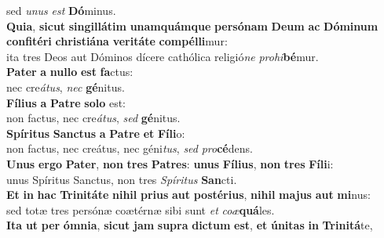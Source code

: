 \evenverse sed \textit{u}\textit{nus} \textit{est} \textbf{Dó}minus.\\
\oddverse \textbf{Qui}\textbf{a}, \textbf{si}\textbf{cut} \textbf{sin}\textbf{gil}\textbf{lá}\textbf{tim} \textbf{u}\textbf{nam}\textbf{quám}\textbf{que} \textbf{per}\textbf{só}\textbf{nam} \textbf{De}\textbf{um} \textbf{ac} \textbf{Dó}\textbf{mi}\textbf{num} \textbf{con}\textbf{fi}\textbf{té}\textbf{ri} \textbf{chri}\textbf{sti}\textbf{á}\textbf{na} \textbf{ve}\textbf{ri}\textbf{tá}\textbf{te} \textbf{com}\textbf{pél}\textbf{li}mur:~\*\\
\oddverse ita tres Deos aut Dóminos dícere cathólica religió\textit{ne} \textit{pro}\textit{hi}\textbf{bé}mur.\\
\evenverse \textbf{Pa}\textbf{ter} \textbf{a} \textbf{nul}\textbf{lo} \textbf{est} \textbf{fa}ctus:~\*\\
\evenverse nec cre\textit{á}\textit{tus}, \textit{nec} \textbf{gé}nitus.\\
\oddverse \textbf{Fí}\textbf{li}\textbf{us} \textbf{a} \textbf{Pa}\textbf{tre} \textbf{so}\textbf{lo} est:~\*\\
\oddverse non factus, nec cre\textit{á}\textit{tus}, \textit{sed} \textbf{gé}nitus.\\
\evenverse \textbf{Spí}\textbf{ri}\textbf{tus} \textbf{San}\textbf{ctus} \textbf{a} \textbf{Pa}\textbf{tre} \textbf{et} \textbf{Fí}\textbf{li}o:~\*\\
\evenverse non factus, nec creátus, nec géni\textit{tus}, \textit{sed} \textit{pro}\textbf{cé}dens.\\
\oddverse \textbf{U}\textbf{nus} \textbf{er}\textbf{go} \textbf{Pa}\textbf{ter}, \textbf{non} \textbf{tres} \textbf{Pa}\textbf{tres}: \textbf{u}\textbf{nus} \textbf{Fí}\textbf{li}\textbf{us}, \textbf{non} \textbf{tres} \textbf{Fí}\textbf{li}i:~\*\\
\oddverse unus Spíritus Sanctus, non tres \textit{Spí}\textit{ri}\textit{tus} \textbf{San}cti.\\
\evenverse \textbf{Et} \textbf{in} \textbf{hac} \textbf{Tri}\textbf{ni}\textbf{tá}\textbf{te} \textbf{ni}\textbf{hil} \textbf{pri}\textbf{us} \textbf{aut} \textbf{po}\textbf{sté}\textbf{ri}\textbf{us}, \textbf{ni}\textbf{hil} \textbf{ma}\textbf{jus} \textbf{aut} \textbf{mi}nus:~\*\\
\evenverse sed totæ tres persónæ coætérnæ sibi sunt \textit{et} \textit{co}\textit{æ}\textbf{quá}les.\\
\oddverse \textbf{I}\textbf{ta} \textbf{ut} \textbf{per} \textbf{óm}\textbf{ni}\textbf{a}, \textbf{si}\textbf{cut} \textbf{jam} \textbf{su}\textbf{pra} \textbf{di}\textbf{ctum} \textbf{est}, \textbf{et} \textbf{ú}\textbf{ni}\textbf{tas} \textbf{in} \textbf{Tri}\textbf{ni}\textbf{tá}te,~\*\\
